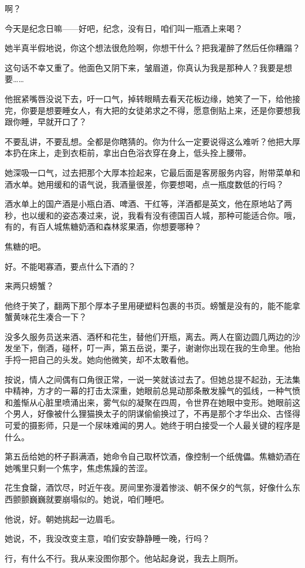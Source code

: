 \documentclass[lang=cn,newtx,12pt,scheme=chinese]{elegantbook}
\begin{document}
啊？

今天是纪念日嘛——好吧，纪念，没有日，咱们叫一瓶酒上来喝？

她半真半假地说，你这个想法很危险啊，你想干什么？把我灌醉了然后任你糟蹋？

这句话不幸又重了。他面色又阴下来，皱眉道，你真认为我是那种人？我要是想要……

他抿紧嘴唇没说下去，吁一口气，掉转眼睛去看天花板边缘，她笑了一下，给他接完，你要是想要睡女人，有大把的女徒弟求之不得，愿意倒贴上来，还是你要想我跟你睡，早就开口了？

不要乱讲，不要乱想。全都是你瞎猜的。你为什么一定要说得这么难听？他把大厚本扔在床上，走到衣柜前，拿出白色浴衣穿在身上，低头拴上腰带。

她深吸一口气，过去把那个大厚本捡起来，它最后面是客房服务内容，附带菜单和酒水单。她用缓和的语气说，我酒量很差，你要想喝，点一瓶度数低的行吗？

酒水单上的国产酒是小瓶白酒、啤酒、干红等，洋酒都是英文，他在原地站了两秒，也以缓和的姿态凑过来，说，我看有没有德国百人城，那种可能适合你。哦，有的，有百人城焦糖奶酒和森林浆果酒，你想要哪种？

焦糖的吧。

好。不能喝寡酒，要点什么下酒的？

来两只螃蟹？

他终于笑了，翻两下那个厚本子里用硬塑料包裹的书页。螃蟹是没有的，能不能拿蟹黄味花生凑合一下？

没多久服务员送来酒、酒杯和花生，替他们开瓶，离去。两人在窗边圆几两边的沙发坐下，倒酒，碰杯，叮一声，第五岳说，栗子，谢谢你出现在我的生命里。他抬手捋一把自己的头发。她向他微笑，却不太敢看他。

按说，情人之间偶有口角很正常，一说一笑就该过去了。但她总提不起劲，无法集中精神，方才的一幕的打击太深重，她眼前总晃动那条散发臊气的弧线，一种气愤和羞惭从心脏里喷涌出来，雾气似的凝聚在四周，令世界在她眼中变形。她眼前这个男人，好像被什么狸猫换太子的阴谋偷偷换过了，不再是那个才华出众、古怪得可爱的摄影师，只是一个尿味难闻的男人。她终于明白接受一个人最关键的程序是什么。

第五岳给她的杯子斟满酒，她命令自己取杯饮酒，像控制一个纸傀儡。焦糖奶酒在她嘴里只剩一个焦字，焦虑焦躁的苦涩。

花生食罄，酒饮尽，时近午夜。房间里弥漫着惨淡、朝不保夕的气氛，好像什么东西颤颤巍巍就要崩塌似的。她说，咱们睡吧。

他说，好。朝她挑起一边眉毛。

她说，不，我没改变主意，咱们安安静静睡一晚，行吗？

行，有什么不行。我从来没图你那个。他站起身说，我去上厕所。
\end{document}
